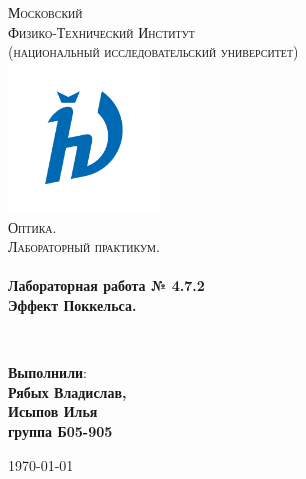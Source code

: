 \documentclass[a4paper,12pt]{article}
\begin{document}
\begin{titlepage}
	\begin{center}
		
		\textsc{\LARGE Московский\\[-0.2cm]Физико-Технический Институт\\[0.1cm]\large (национальный исследовательский университет)}\\[1.5cm] 
		
	\includegraphics[width=0.3\textwidth]{hv_s_no_bg.png}~\\[1cm]

	\textsc{\Large Оптика. \\ Лабораторный практикум. }\\[0.2cm]

	\HRule \\[0.4cm]
	{ \LARGE \bfseries Лабораторная работа № 4.7.2 \\ Эффект Поккельса. \\[0.4cm] }

	\HRule \\[1.5cm]
		
		\noindent
		\begin{minipage}{0.4\textwidth}
			\begin{flushleft} \large
			\end{flushleft}
		\end{minipage}%
		\begin{minipage}{0.4\textwidth}
			\begin{flushright} \large
			\end{flushright}
		\end{minipage}
		
		
		\large{\begin{flushright}
				\vfill
				\textbf{Выполнили}:\\
				\textbf{Рябых Владислав,\\}
				\textbf{Исыпов Илья\\}
				\textbf{группа Б05-905}
		\end{flushright}}
		
		
		{\large \today}\\
		
		
	\end{center}
\end{titlepage}
\end{document}
